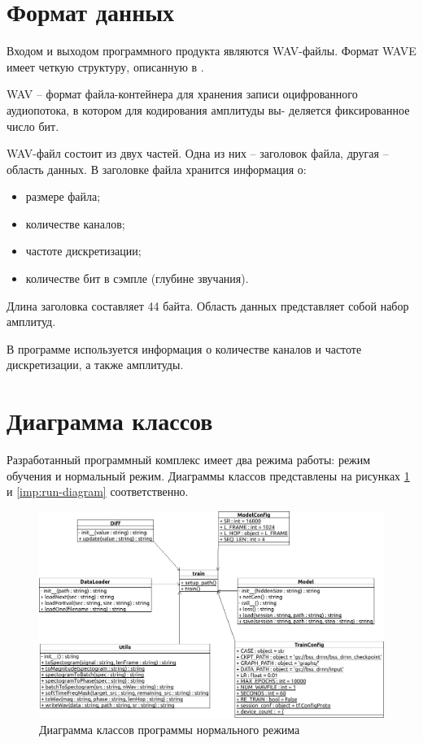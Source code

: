 \section{Формат данных}

Входом и выходом программного продукта являются WAV-файлы. Формат WAVE имеет четкую структуру, описанную в \cite{wavv}.

WAV -- формат файла-контейнера для хранения записи оцифрованного аудиопотока, в котором для кодирования амплитуды вы- деляется фиксированное число бит.

WAV-файл состоит из двух частей. Одна из них -- заголовок файла, другая -- область данных. В заголовке файла хранится информация о:

\begin{itemize}
	\item размере файла;
	\item количестве каналов;
	\item частоте дискретизации;
	\item количестве бит в сэмпле (глубине звучания).
\end{itemize}

Длина заголовка составляет 44 байта. Область данных представляет собой набор амплитуд. 

В программе используется информация о количестве каналов и частоте дискретизации, а также амплитуды.

\section{Диаграмма классов}

Разработанный программный комплекс имеет два режима работы: режим обучения и нормальный режим. Диаграммы классов представлены на рисунках \ref{imp:train} и \ref{imp:run-diagram} соответственно.

\begin{figure}
	\centering
	\includegraphics[width=\textwidth]{inc/img/train}
	\caption{Диаграмма классов программы нормального режима}
	\label{imp:train}
\end{figure}

